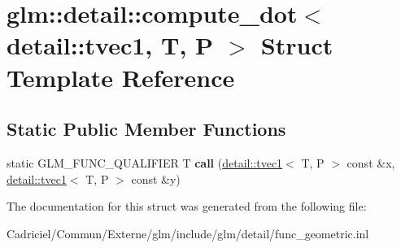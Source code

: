 \hypertarget{structglm_1_1detail_1_1compute__dot_3_01detail_1_1tvec1_00_01_t_00_01_p_01_4}{}\section{glm\+:\+:detail\+:\+:compute\+\_\+dot$<$ detail\+:\+:tvec1, T, P $>$ Struct Template Reference}
\label{structglm_1_1detail_1_1compute__dot_3_01detail_1_1tvec1_00_01_t_00_01_p_01_4}
\subsection*{Static Public Member Functions}
\begin{DoxyCompactItemize}
\item 
static G\+L\+M\+\_\+\+F\+U\+N\+C\+\_\+\+Q\+U\+A\+L\+I\+F\+I\+ER T {\bfseries call} (\hyperlink{structglm_1_1detail_1_1tvec1}{detail\+::tvec1}$<$ T, P $>$ const \&x, \hyperlink{structglm_1_1detail_1_1tvec1}{detail\+::tvec1}$<$ T, P $>$ const \&y)\hypertarget{structglm_1_1detail_1_1compute__dot_3_01detail_1_1tvec1_00_01_t_00_01_p_01_4_a8a857cb8e3ad91ffec9e5d2e8517be41}{}\label{structglm_1_1detail_1_1compute__dot_3_01detail_1_1tvec1_00_01_t_00_01_p_01_4_a8a857cb8e3ad91ffec9e5d2e8517be41}

\end{DoxyCompactItemize}


The documentation for this struct was generated from the following file\+:\begin{DoxyCompactItemize}
\item 
Cadriciel/\+Commun/\+Externe/glm/include/glm/detail/func\+\_\+geometric.\+inl\end{DoxyCompactItemize}

